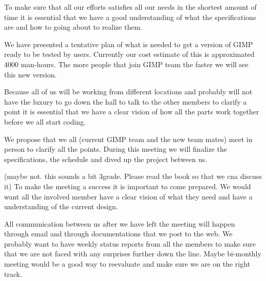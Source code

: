 To make sure that all our efforts satisfies all our needs in the shortest amount of time it is essential that we have a good understanding of what the specifications are and how to going about to realize them. 

We have presented a tentative plan of what is needed to get a version of GIMP ready to be tested by users. Currently our cost estimate of this is approximated 4000 man-hours. The more people that join GIMP team the faster we will see this new version.

Because all of us will be working from different locations and probably will not have the luxury to go down the hall to talk to the other members to clarify a point it is essential that we have a clear vision of how all the parts work together before we all start coding.

We propose that we all (current GIMP team and the new team mates) meet in person to clarify all the points. During this meeting we will finalize the specifications, the schedule and dived up the project between us.

(maybe not. this sounds a bit 3grade. Please read the book so that we cna discuss it)
To make the meeting a success it is important to come prepared. We would want all the involved member have a clear vision of what they need and have a understanding of the current design. 

All communication between us after we have left the meeting will happen through email and through documentations that we post to the web. We probably want to have weekly status reports from all the members to make sure that we are not faced with any surprises further down the line. Maybe bi-monthly meeting would be a good way to reevaluate and make sure we are on the right track.
 
 




